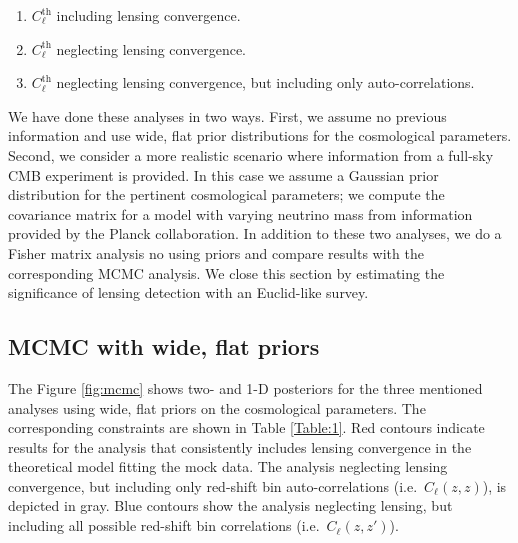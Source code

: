 \begin{enumerate}
\item $C_\ell^{\mathrm{th}}$ including lensing convergence.
\item $C_\ell^{\mathrm{th}}$ neglecting lensing convergence.
\item $C_\ell^{\mathrm{th}}$ neglecting lensing convergence, but including only auto-correlations.
\end{enumerate}

We have done these analyses in two ways. First, we assume no previous information and use wide, flat prior distributions for the cosmological parameters. Second, we consider a more realistic scenario where information from a full-sky CMB experiment is provided. In this case we assume a Gaussian prior distribution for the pertinent cosmological parameters; we compute the covariance matrix for a model with varying neutrino mass from information provided by the Planck collaboration. In addition to these two analyses, we do a Fisher matrix analysis no using priors and compare results with the corresponding MCMC analysis. We close this section by estimating the significance of lensing detection with an Euclid-like survey.

\subsection{MCMC with wide, flat priors}

The Figure \ref{fig:mcmc} shows two- and 1-D posteriors for the three mentioned analyses using wide, flat priors on the cosmological parameters. The corresponding constraints are shown in Table \ref{Table:1}. Red contours indicate results for the analysis that consistently includes lensing convergence in the theoretical model fitting the mock data. The analysis neglecting lensing convergence, but including only red-shift bin auto-correlations (i.e.\ $C_\ell(z,z)$), is depicted in gray. Blue contours show the analysis neglecting lensing, but including all possible red-shift bin correlations (i.e.\ $C_\ell(z,z')$).      

